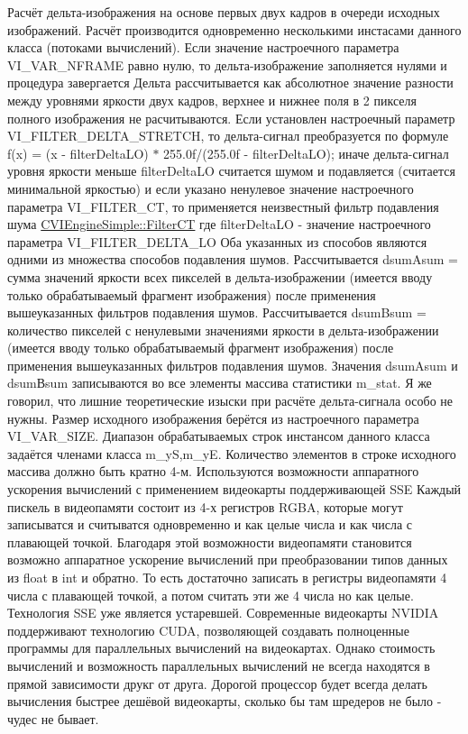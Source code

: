 Расчёт дельта-\/изображения на основе первых двух кадров в очереди исходных изображений. Расчёт производится одновременно несколькими инстасами данного класса (потоками вычислений). Если значение настроечного параметра V\+I\+\_\+\+V\+A\+R\+\_\+\+N\+F\+R\+A\+M\+E равно нулю, то дельта-\/изображение заполняется нулями и процедура завергается Дельта рассчитывается как абсолютное значение разности между уровнями яркости двух кадров, верхнее и нижнее поля в 2 пикселя полного изображения не расчитываются. Если установлен настроечный параметр V\+I\+\_\+\+F\+I\+L\+T\+E\+R\+\_\+\+D\+E\+L\+T\+A\+\_\+\+S\+T\+R\+E\+T\+C\+H, то дельта-\/сигнал преобразуется по формуле f(x) = (x -\/ filter\+Delta\+L\+O) $\ast$ 255.\+0f/(255.\+0f -\/ filter\+Delta\+L\+O); иначе дельта-\/сигнал уровня яркости меньше filter\+Delta\+L\+O считается шумом и подавляется (считается минимальной яркостью) и если указано ненулевое значение настроечного параметра V\+I\+\_\+\+F\+I\+L\+T\+E\+R\+\_\+\+C\+T, то применяется неизвестный фильтр подавления шума \hyperlink{class_c_v_i_engine_simple_a2b0441394c18c07d7d90fb13998c0355}{C\+V\+I\+Engine\+Simple\+::\+Filter\+C\+T} где filter\+Delta\+L\+O -\/ значение настроечного параметра V\+I\+\_\+\+F\+I\+L\+T\+E\+R\+\_\+\+D\+E\+L\+T\+A\+\_\+\+L\+O Оба указанных из способов являются одними из множества способов подавления шумов. Рассчитывается dsum\+Asum = сумма значений яркости всех пикселей в дельта-\/изображении (имеется вводу только обрабатываемый фрагмент изображения) после применения вышеуказанных фильтров подавления шумов. Рассчитывается dsum\+Bsum = количество пикселей с ненулевыми значениями яркости в дельта-\/изображении (имеется вводу только обрабатываемый фрагмент изображения) после применения вышеуказанных фильтров подавления шумов. Значения dsum\+Asum и dsumВsum записываются во все элементы массива статистики m\+\_\+stat. Я же говорил, что лишние теоретические изыски при расчёте дельта-\/сигнала особо не нужны. Размер исходного изображения берётся из настроечного параметра V\+I\+\_\+\+V\+A\+R\+\_\+\+S\+I\+Z\+E. Диапазон обрабатываемых строк инстансом данного класса задаётся членами класса m\+\_\+y\+S,m\+\_\+y\+E. Количество элементов в строке исходного массива должно быть кратно 4-\/м. Используются возможности аппаратного ускорения вычислений с применением видеокарты поддерживающей S\+S\+E Каждый пискель в видеопамяти состоит из 4-\/х регистров R\+G\+B\+A, которые могут записыватся и считыватся одновременно и как целые числа и как числа с плавающей точкой. Благодаря этой возможности видеопамяти становится возможно аппаратное ускорение вычислений при преобразовании типов данных из float в int и обратно. То есть достаточно записать в регистры видеопамяти 4 числа с плавающей точкой, а потом считать эти же 4 числа но как целые. Технология S\+S\+E уже является устаревшей. Современные видеокарты N\+V\+I\+D\+I\+A поддерживают технологию C\+U\+D\+A, позволяющей создавать полноценные программы для параллельных вычислений на видеокартах. Однако стоимость вычислений и возможность параллельных вычислений не всегда находятся в прямой зависимости друкг от друга. Дорогой процессор будет всегда делать вычисления быстрее дешёвой видеокарты, сколько бы там шредеров не было -\/ чудес не бывает. 

